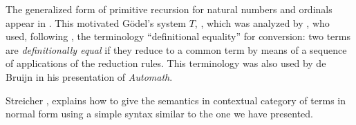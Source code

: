   The generalized form of primitive recursion for natural numbers and ordinals
  appear in \cite{Hilbert-1925}.  This motivated G\"odel's system $T$,
  \cite{Goedel-T-1958}, which was analyzed by \cite{Tait-1966}, who used,
  following \cite{Goedel-1958}, the terminology ``definitional equality'' for
  conversion: two terms are {\em definitionally equal} if they reduce to a
  common term by means of a sequence of applications of the reduction
  rules. This terminology was also used by de Bruijn \cite{deBruijn-1973} in his
  presentation of {\em Automath}.

  Streicher \cite[Theorem 4.13]{Streicher-1991}, explains how to give the
  semantics in contextual category of terms in normal form using a simple syntax
  similar to the one we have presented.


